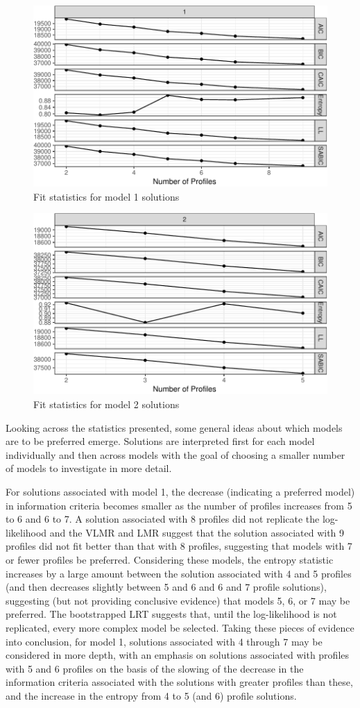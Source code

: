 \documentclass[]{msu-thesis}
\theoremstyle{definition}
\theoremstyle{definition}
\theoremstyle{definition}
\theoremstyle{remark}
\begin{document}
\begin{figure}

{\centering \includegraphics[width=0.5\linewidth]{rosenberg-dissertation_files/figure-latex/model1-1} 

}

\caption{Fit statistics for model 1 solutions}\label{fig:model1}
\end{figure}

\begin{figure}

{\centering \includegraphics[width=0.4\linewidth]{rosenberg-dissertation_files/figure-latex/model2-1} 

}

\caption{Fit statistics for model 2 solutions}\label{fig:model2}
\end{figure}

Looking across the statistics presented, some general ideas about which
models are to be preferred emerge. Solutions are interpreted first for
each model individually and then across models with the goal of choosing
a smaller number of models to investigate in more detail.

For solutions associated with model 1, the decrease (indicating a
preferred model) in information criteria becomes smaller as the number
of profiles increases from 5 to 6 and 6 to 7. A solution associated with
8 profiles did not replicate the log-likelihood and the VLMR and LMR
suggest that the solution associated with 9 profiles did not fit better
than that with 8 profiles, suggesting that models with 7 or fewer
profiles be preferred. Considering these models, the entropy statistic
increases by a large amount between the solution associated with 4 and 5
profiles (and then decreases slightly between 5 and 6 and 6 and 7
profile solutions), suggesting (but not providing conclusive evidence)
that models 5, 6, or 7 may be preferred. The bootstrapped LRT suggests
that, until the log-likelihood is not replicated, every more complex
model be selected. Taking these pieces of evidence into conclusion, for
model 1, solutions associated with 4 through 7 may be considered in more
depth, with an emphasis on solutions associated with profiles with 5 and
6 profiles on the basis of the slowing of the decrease in the
information criteria associated with the solutions with greater profiles
than these, and the increase in the entropy from 4 to 5 (and 6) profile
solutions.
\end{document}
